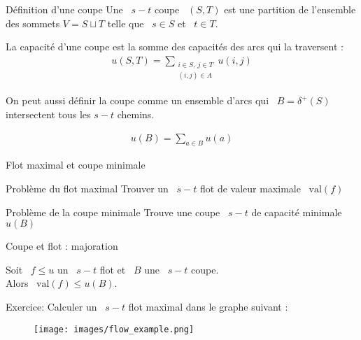 \documentclass{beamer}
\newcommand{\val}{\mathrm{val}}
\begin{document}
\begin{frame}[t]{Définition d'une coupe} 
  Une ~$s-t$ coupe ~$(S, T)$ est une partition de l'ensemble des sommets $V = S \sqcup T$ telle que ~$s \in S$ et ~$t \in T$.

  \pause
  
  
  La capacité d'une coupe est la somme des capacités des arcs qui la traversent : \pause
  \begin{align*}
    u(S, T) = \sum_{\substack{i \in S,~ j \in T\\(i,j) \in A}} u(i,j)
  \end{align*}

   On peut aussi définir la coupe comme un ensemble d'arcs qui ~$B = \delta^+(S)$ intersectent tous les $s-t$ chemins.
   
  \begin{align*}
  	u(B) = \sum_{a \in B} u(a)
  \end{align*}
\end{frame}

\begin{frame}{Flot maximal et coupe minimale} \pause
  \vfill
  \begin{exampleblock}{Problème du flot maximal}
    Trouver un ~$s-t$ flot de valeur maximale ~$\val(f)$ 
  \end{exampleblock}
  \vfill \pause
  \begin{exampleblock}{Problème de la coupe minimale}
    Trouve une coupe ~$s-t$ de capacité minimale ~$u(B)$
  \end{exampleblock}
  \vfill
\end{frame}

    



\begin{frame}[t]{Coupe et flot : majoration}
  \begin{proposition}[6.3]
    Soit ~$f \leq u$ un ~$s-t$ flot et ~$B$ une ~$s-t$ coupe.\\
    Alors ~$\val(f) \leq u(B)$.
  \end{proposition}
  \pause
Exercice: Calculer un ~$s-t$ flot maximal dans le graphe suivant :
    \begin{figure}
    \centering
    \texttt{[image: images/flow\_example.png]}
\end{figure}

\end{frame}
\end{document}
